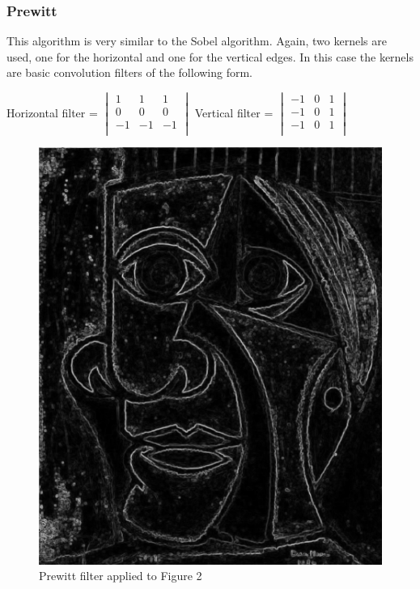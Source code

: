 \documentclass[12pt]{article}
\begin{document}
\subsubsection{Prewitt}
This algorithm is very similar to the Sobel algorithm. Again, two kernels are used, one for the horizontal and one for the vertical edges. In this case the kernels are basic convolution filters of the following form. 
\newline

Horizontal filter = $\begin{vmatrix}
        1 & 1 & 1\\
        0 & 0 & 0\\
        -1 & -1 & -1\\
\end{vmatrix}$\hspace{11mm}
Vertical filter = $\begin{vmatrix}
        -1 & 0 & 1\\
        -1 & 0 & 1\\
        -1 & 0 & 1\\
\end{vmatrix}$
\newline

\begin{figure}[h]
\centering
\includegraphics[scale = 0.39]{img/picassoPrewitt}
\caption{Prewitt filter applied to Figure 2}
\end{figure}
\newpage
\end{document}
